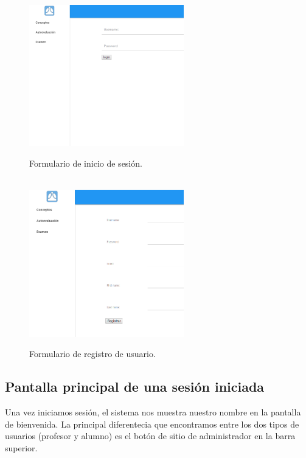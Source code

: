 \begin{figure}
 	\centering
    \includegraphics[width=0.6\textwidth]{../images/manual/login.png}
    \caption{Formulario de inicio de sesión.}
	\label{fig:man_login}
	\\
 	\centering
    \includegraphics[width=0.6\textwidth]{../images/manual/registrar.png}
    \caption{Formulario de registro de usuario.}
    \label{fig:man_register}
\end{figure}




\newpage

\subsection{Pantalla principal de una sesión iniciada}

\bigskip
Una vez iniciamos sesión, el sistema nos muestra nuestro nombre en la pantalla de bienvenida.
La principal diferentecia que encontramos entre los dos tipos de usuarios (profesor y alumno) es el botón de sitio de administrador en la barra superior.


